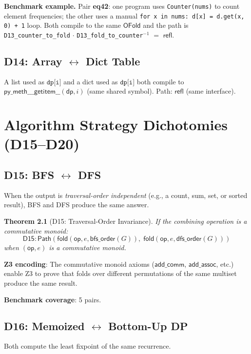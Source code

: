 \documentclass[11pt,a4paper]{report}
\theoremstyle{definition}
\theoremstyle{plain}
\newtheorem{theorem}[definition]{Theorem}
\newcommand{\Path}{\mathsf{Path}}
\newcommand{\fold}{\mathsf{fold}}
\newcommand{\op}{\mathsf{op}}
\begin{document}
\textbf{Benchmark example.}
Pair \textbf{eq42}: one program uses \texttt{Counter(nums)} to count
element frequencies; the other uses a manual \texttt{for x in nums:
d[x] = d.get(x, 0) + 1} loop.  Both compile to the same
$\mathsf{OFold}$ and the path is \texttt{D13\_counter\_to\_fold}
$\cdot$ \texttt{D13\_fold\_to\_counter}$^{-1}$ $=$ $\mathsf{refl}$.

\section{D14: Array $\leftrightarrow$ Dict Table}

A list used as $\texttt{dp[i]}$ and a dict used as $\texttt{dp[i]}$
both compile to $\mathsf{py\_meth\_\_\_getitem\_\_}(\mathsf{dp}, i)$
(same shared symbol).  Path: $\mathsf{refl}$ (same interface).


\chapter{Algorithm Strategy Dichotomies (D15--D20)}
\label{ch:algo-dichotomies}

\section{D15: BFS $\leftrightarrow$ DFS}

When the output is \emph{traversal-order independent} (e.g., a count,
sum, set, or sorted result), BFS and DFS produce the same answer.

\begin{theorem}[D15: Traversal-Order Invariance]
If the combining operation is a commutative monoid:
\[
  \mathsf{D15} : \Path(\fold(\op, e, \mathsf{bfs\_order}(G)),\;
  \fold(\op, e, \mathsf{dfs\_order}(G)))
\]
when $(\op, e)$ is a commutative monoid.
\end{theorem}

\textbf{Z3 encoding}: The commutative monoid axioms
($\mathsf{add\_comm}$, $\mathsf{add\_assoc}$, etc.) enable Z3 to
prove that folds over different permutations of the same multiset
produce the same result.

\textbf{Benchmark coverage}: 5 pairs.

\section{D16: Memoized $\leftrightarrow$ Bottom-Up DP}
\label{sec:d16-memo}

Both compute the least fixpoint of the same recurrence.
\end{document}

